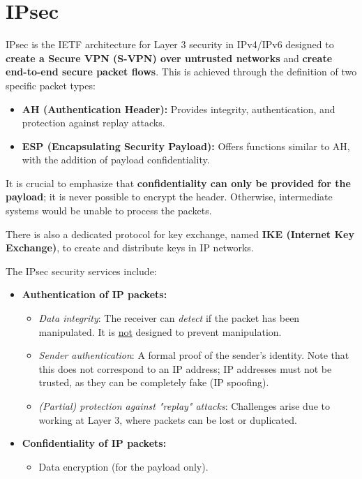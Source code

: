 \section{IPsec}

IPsec is the IETF architecture for Layer 3 security in IPv4/IPv6 designed to \textbf{create a Secure VPN (S-VPN) over untrusted networks} and \textbf{create end-to-end secure packet flows}. This is achieved through the definition of two specific packet types:

\begin{itemize}
    \item \textbf{AH (Authentication Header):}
          Provides integrity, authentication, and protection against replay attacks.
    \item \textbf{ESP (Encapsulating Security Payload):}
          Offers functions similar to AH, with the addition of payload confidentiality.
\end{itemize}

It is crucial to emphasize that \textbf{confidentiality can only be provided for the payload}; it is never possible to encrypt the header. Otherwise, intermediate systems would be unable to process the packets.

There is also a dedicated protocol for key exchange, named \textbf{IKE (Internet Key Exchange)}, to create and distribute keys in IP networks.

The IPsec security services include:

\begin{itemize}
    \item \textbf{Authentication of IP packets:}
          \begin{itemize}
              \item \textit{Data integrity}: The receiver can \textit{detect} if the packet has been manipulated. It is \underline{not} designed to prevent manipulation.
              \item \textit{Sender authentication}: A formal proof of the sender's identity. Note that this does not correspond to an IP address; IP addresses must not be trusted, as they can be completely fake (IP spoofing).
              \item \textit{(Partial) protection against "replay" attacks}: Challenges arise due to working at Layer 3, where packets can be lost or duplicated.
          \end{itemize}
    \item \textbf{Confidentiality of IP packets:}
          \begin{itemize}
              \item Data encryption (for the payload only).
          \end{itemize}
\end{itemize}



